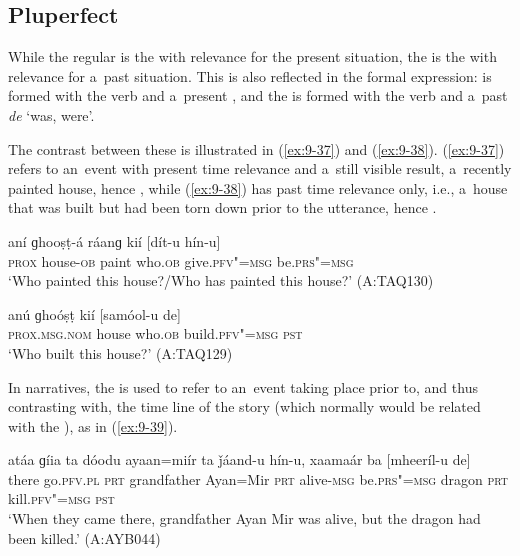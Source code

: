\subsection{Pluperfect}
\label{subsec:9-1-8}

While the regular  is the  with relevance for the present situation, the  is the  with relevance for a~past situation. This is also reflected in the formal expression:  is formed with the  verb and a~present  , and the  is formed with the  verb and a~past   \textit{de} `was, were'. 


The contrast between these is illustrated in (\ref{ex:9-37}) and (\ref{ex:9-38}). (\ref{ex:9-37}) refers to an~event with present time relevance and a~still visible result, a~recently painted house, hence , while (\ref{ex:9-38}) has past time relevance only, i.e., a~house that was built but had been torn down prior to the utterance, hence .

\begin{exe}
\ex
\label{ex:9-37}
\gll aní ɡhooṣṭ-á ráanɡ kií [dít-u hín-u]  \\
\textsc{prox} house-\textsc{ob} paint who.\textsc{ob} give.\textsc{pfv"=msg} be.\textsc{prs"=msg} \\
\glt `Who painted this house?/Who has painted this house?' (A:TAQ130)

\ex
\label{ex:9-38}
\gll anú ɡhoóṣṭ kií [samóol-u de] \\
\textsc{prox.msg.nom} house who.\textsc{ob} build.\textsc{pfv"=msg} \textsc{pst} \\
\glt `Who built this house?' (A:TAQ129)
\end{exe}

In narratives, the  is used to refer to an~event taking place prior to, and thus contrasting with, the time line of the story (which normally would be related with the ), as in (\ref{ex:9-39}).

\begin{exe}
\ex
\label{ex:9-39}
\gll atáa ɡíia ta dóodu ayaan=miír ta ǰáand-u hín-u, xaamaár ba [mheeríl-u de] \\
there go.\textsc{pfv.pl} \textsc{prt} grandfather Ayan=Mir \textsc{prt}  alive-\textsc{msg}
be.\textsc{prs"=msg} dragon \textsc{prt} kill.\textsc{pfv"=msg} \textsc{pst} \\
\glt `When they came there, grandfather Ayan Mir was alive, but the dragon had been killed.' (A:AYB044) 
\end{exe}

